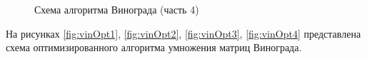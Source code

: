 \begin{figure}
\caption{Схема алгоритма Винограда (часть 4)}
\label{fig:vin4}
\end{figure}

\newpage
На рисунках \ref{fig:vinOpt1}, \ref{fig:vinOpt2}, \ref{fig:vinOpt3}, \ref{fig:vinOpt4} представлена схема оптимизированного алгоритма умножения матриц Винограда.

